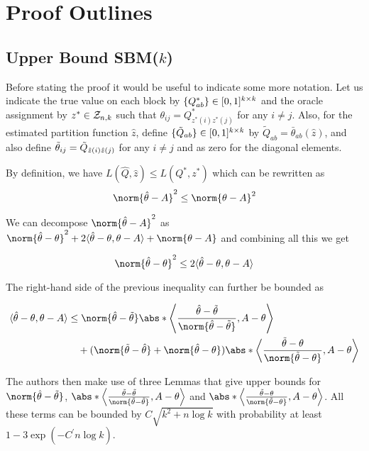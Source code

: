 \documentclass[11pt]{article}
\begin{document}
\section{Proof Outlines}\label{sec:proofs}

\subsection{Upper Bound SBM($k$)} \label{sec:upper_sbm}

Before stating the proof it would be useful to indicate some more notation. Let us indicate the true value on each block by $\{Q^\ast_{ab}\} \in \lbrack0,1\rbrack^{k \times k}$ and the oracle assignment by $z^\ast \in \mathcal{Z}_{n,k}$ such that $\theta_{ij} = Q^\ast_{z^\ast(i)z^\ast(j)}$ for any $i\neq j$. Also, for the estimated partition function $\hat{z}$, define $\{\tilde{Q}_{ab}\} \in \lbrack0,1\rbrack^{k \times k}$  by $\tilde{Q}_{ab} = \bar{\theta}_{ab}(\hat{z})$, and also define $\Tilde{\theta}_{ij}=\tilde{Q}_{\hat{z}(i)\hat{z}(j)}$ for any $i \neq j$ and as zero for the diagonal elements. 

By definition, we have $L(\hat{Q},\hat{z}) \leq L(Q^\ast, z^\ast)$ which can be rewritten as 
\[ \norm{\htheta - A}^2 \leq \norm{\theta - A}^2 \]

We can decompose $\norm{\htheta - A}^2$ as $\norm{\htheta - \theta}^2 + 2\dprod{\htheta - \theta, \theta - A} + \norm{\theta - A}$ and combining all this we get

\[  \norm{\htheta - \theta}^2 \leq 2\dprod{\htheta - \theta, \theta - A}  \]

The right-hand side of the previous inequality can further be bounded as 

\begin{align*}
    \dprod{\htheta - \theta, \theta - A} & \leq \norm{\htheta - \ttheta}\abs*{\dprod*{\frac{\htheta-\ttheta}{\norm{\htheta - \ttheta}}, A - \theta  }} \\
  & \quad + (\norm{\ttheta - \htheta} + \norm{\htheta - \theta})\abs*{\dprod*{\frac{\ttheta-\theta}{\norm{\ttheta-\theta}},A-\theta}}
\end{align*}

The authors then make use of three Lemmas that give upper bounds for $\norm{\htheta-\ttheta}$, $\abs*{\dprod*{\frac{\ttheta-\ttheta}{\norm{\ttheta-\ttheta}},A-\theta}}$ and $\abs*{\dprod*{\frac{\ttheta-\theta}{\norm{\ttheta-\theta}},A-\theta}}$. All these terms can be bounded by $C\sqrt{k^2 +n\log k}$ with probability at least $1-3\exp(-C^\prime n\log k)$. 
\end{document}
